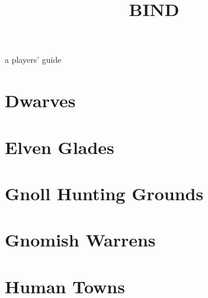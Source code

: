 \documentclass[a4paper,openany]{book}
\title{BIND}
\begin{document}

%
  {a players' guide}%

\glsunsetall



\clearpage



\printglossary[
  style=topicmcols,
  nonumberlist,
  ]

\printglossary[
  type=mech,
  style=topicmcols,
  nonumberlist,
  ]

\glsresetall

\mainmatter

\setcounter{track}{1}






\section[Dwarves]{Dwarves \Dw}

\begin{multicols}{2}
  
\end{multicols}

\section[Elves]{Elven Glades \El}
\begin{multicols}{2}
  
\end{multicols}

\section[Gnolls]{Gnoll Hunting Grounds \Nl}
\begin{multicols}{2}
  
\end{multicols}

\section[Gnomes]{Gnomish Warrens \Gn}
\begin{multicols}{2}
  
\end{multicols}

\section[Humans]{Human Towns \Hu}
\begin{multicols}{2}
  
\end{multicols}









\startappendix

\printindex

\cleardoublepage
\end{document}
